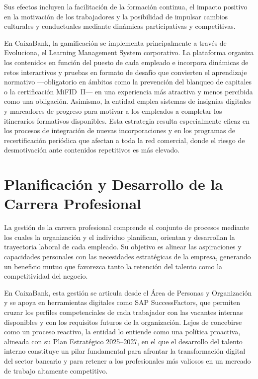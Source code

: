 Sus efectos incluyen la facilitación de la formación continua, el impacto positivo en la
motivación de los trabajadores y la posibilidad de impulsar cambios culturales y conductuales
mediante dinámicas participativas y competitivas.

En CaixaBank, la gamificación se implementa principalmente a través de Evoluciona, el Learning
Management System corporativo. La plataforma organiza los contenidos en función del puesto de
cada empleado e incorpora dinámicas de retos interactivos y pruebas en formato de desafío que
convierten el aprendizaje normativo —obligatorio en ámbitos como la prevención del blanqueo de
capitales o la certificación MiFID~II— en una experiencia más atractiva y menos percibida como
una obligación. Asimismo, la entidad emplea sistemas de insignias digitales y marcadores de
progreso para motivar a los empleados a completar los itinerarios formativos disponibles. Esta
estrategia resulta especialmente eficaz en los procesos de integración de nuevas incorporaciones
y en los programas de recertificación periódica que afectan a toda la red comercial, donde el
riesgo de desmotivación ante contenidos repetitivos es más elevado.


\chapter{Planificación y Desarrollo de la Carrera Profesional}

La gestión de la carrera profesional comprende el conjunto de procesos mediante los cuales
la organización y el individuo planifican, orientan y desarrollan la trayectoria laboral de
cada empleado. Su objetivo es alinear las aspiraciones y capacidades personales con las
necesidades estratégicas de la empresa, generando un beneficio mutuo que favorezca tanto la
retención del talento como la competitividad del negocio.

En CaixaBank, esta gestión se articula desde el Área de Personas y Organización y se apoya
en herramientas digitales como SAP SuccessFactors, que permiten cruzar los perfiles
competenciales de cada trabajador con las vacantes internas disponibles y con los requisitos
futuros de la organización. Lejos de concebirse como un proceso reactivo, la entidad lo
entiende como una política proactiva, alineada con su Plan Estratégico 2025--2027, en el que
el desarrollo del talento interno constituye un pilar fundamental para afrontar la transformación
digital del sector bancario y para retener a los profesionales más valiosos en un mercado de
trabajo altamente competitivo.

